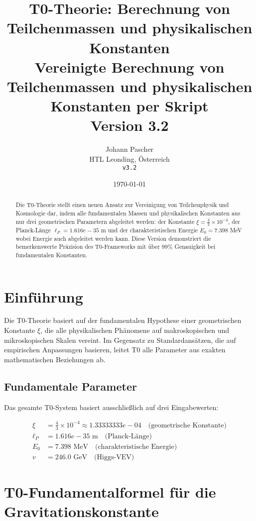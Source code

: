 \documentclass[11pt,a4paper]{article}
\title{\textbf{T0-Theorie: Berechnung von Teilchenmassen und physikalischen Konstanten}\\
	\large Vereinigte Berechnung von Teilchenmassen und physikalischen Konstanten per Skript\\
	\large Version 3.2}
\author{Johann Pascher\\
	HTL Leonding, Österreich\\
	\texttt{v3.2}}
\date{\today}
\begin{document}
	\maketitle
	
	\begin{abstract}
		Die T0-Theorie stellt einen neuen Ansatz zur Vereinigung von Teilchenphysik und Kosmologie dar, indem alle fundamentalen Massen und physikalischen Konstanten aus nur drei geometrischen Parametern abgeleitet werden: der Konstante $\xi = \frac{4}{3} \times 10^{-4}$, der Planck-Länge $\ell_P = 1.616e-35$ m und der charakteristischen Energie $E_0 = 7.398$ MeV wobei Energie auch abgeleitet werden kann. Diese Version demonstriert die bemerkenswerte Präzision des T0-Frameworks mit über 99\% Genauigkeit bei fundamentalen Konstanten.
	\end{abstract}
	
	\tableofcontents
	\newpage
	
	\section{Einführung}
	
	Die T0-Theorie basiert auf der fundamentalen Hypothese einer geometrischen Konstante $\xi$, die alle physikalischen Phänomene auf makroskopischen und mikroskopischen Skalen vereint. Im Gegensatz zu Standardansätzen, die auf empirischen Anpassungen basieren, leitet T0 alle Parameter aus exakten mathematischen Beziehungen ab.
	
	\subsection{Fundamentale Parameter}
	
	Das gesamte T0-System basiert ausschließlich auf drei Eingabewerten:
	
	\begin{align}
		\xi &= \frac{4}{3} \times 10^{-4} \approx 1.33333333e-04 \quad \text{(geometrische Konstante)} \\
		\ell_P &= 1.616e-35 \text{ m} \quad \text{(Planck-Länge)} \\
		E_0 &= 7.398 \text{ MeV} \quad \text{(charakteristische Energie)} \\
		v &= 246.0 \text{ GeV} \quad \text{(Higgs-VEV)}
	\end{align}
	
	\section{T0-Fundamentalformel für die Gravitationskonstante}
	
\end{document}
